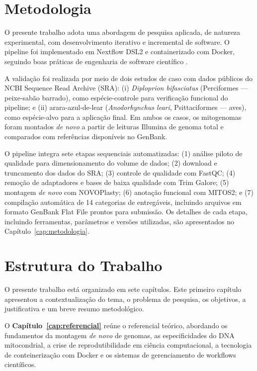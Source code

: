 \section{Metodologia}

O presente trabalho adota uma abordagem de pesquisa aplicada, de natureza experimental, com desenvolvimento iterativo e incremental de software. O pipeline foi implementado em Nextflow DSL2 e containerizado com Docker, seguindo boas práticas de engenharia de software científico \cite{wilson2014}.

A validação foi realizada por meio de dois estudos de caso com dados públicos do NCBI Sequence Read Archive (SRA): (i) \textit{Diploprion bifasciatus} (Perciformes --- peixe-sabão barrado), como espécie-controle para verificação funcional do pipeline; e (ii) arara-azul-de-lear (\textit{Anodorhynchus leari}, Psittaciformes --- aves), como espécie-alvo para a aplicação final. Em ambos os casos, os mitogenomas foram montados \textit{de novo} a partir de leituras Illumina de genoma total e comparados com referências disponíveis no GenBank.

O pipeline integra sete etapas sequenciais automatizadas: (1) análise piloto de qualidade para dimensionamento do volume de dados; (2) download e truncamento dos dados do SRA; (3) controle de qualidade com FastQC; (4) remoção de adaptadores e bases de baixa qualidade com Trim Galore; (5) montagem \textit{de novo} com NOVOPlasty; (6) anotação funcional com MITOS2; e (7) compilação automática de 14 categorias de entregáveis, incluindo arquivos em formato GenBank Flat File prontos para submissão. Os detalhes de cada etapa, incluindo ferramentas, parâmetros e versões utilizadas, são apresentados no Capítulo~\ref{cap:metodologia}.

\section{Estrutura do Trabalho}

O presente trabalho está organizado em sete capítulos. Este primeiro capítulo apresentou a contextualização do tema, o problema de pesquisa, os objetivos, a justificativa e um breve resumo metodológico.

O \textbf{Capítulo~\ref{cap:referencial}} reúne o referencial teórico, abordando os fundamentos da montagem \textit{de novo} de genomas, as especificidades do DNA mitocondrial, a crise de reprodutibilidade em ciência computacional, a tecnologia de conteinerização com Docker e os sistemas de gerenciamento de workflows científicos.

